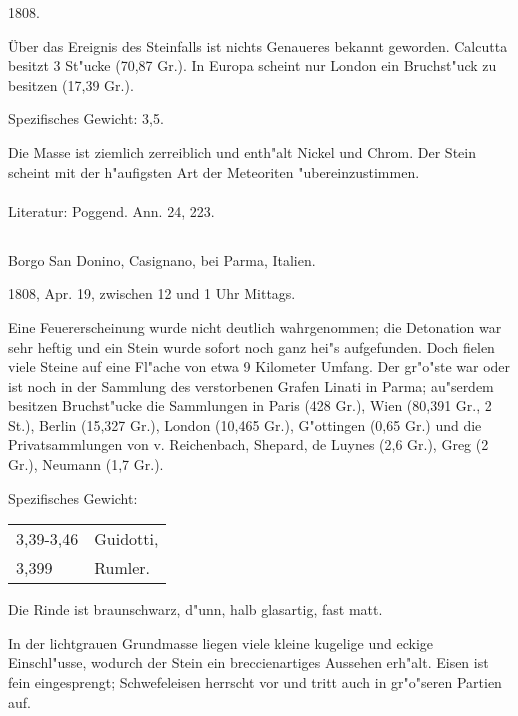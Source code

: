 \documentclass[a4paper, 11pt, oneside]{article}
\begin{document}
1808.

Über das Ereignis des Steinfalls ist nichts Genaueres bekannt geworden. Calcutta besitzt 3 St"ucke (70,87 Gr.). In Europa scheint nur London ein Bruchst"uck zu besitzen (17,39 Gr.).

Spezifisches Gewicht: 3,5.

Die Masse ist ziemlich zerreiblich und enth"alt Nickel und Chrom. Der Stein scheint mit der h"aufigsten Art der Meteoriten "ubereinzustimmen.
\normalsize
\paragraph{}
Literatur: Poggend. Ann. 24, 223.
\subsection{}
\LARGE
\paragraph{}
Borgo San Donino, Casignano, bei Parma, Italien.

1808, Apr. 19, zwischen 12 und 1 Uhr Mittags.

Eine Feuererscheinung wurde nicht deutlich wahrgenommen; die Detonation war sehr heftig und ein Stein wurde sofort noch ganz hei"s aufgefunden. Doch fielen viele Steine auf eine Fl"ache von etwa 9 Kilometer Umfang. Der gr"o"ste war oder ist noch in der Sammlung des verstorbenen Grafen Linati in Parma; au"serdem besitzen Bruchst"ucke die Sammlungen in Paris (428 Gr.), Wien (80,391 Gr., 2 St.), Berlin (15,327 Gr.), London (10,465 Gr.), G"ottingen (0,65 Gr.) und die Privatsammlungen von v. Reichenbach, Shepard, de Luynes (2,6 Gr.), Greg (2 Gr.), Neumann (1,7 Gr.).

Spezifisches Gewicht:
\begin{table}[!ht]
    \centering\swabfamily\Large
    \begin{tabular}{l l}
        3,39-3,46 & Guidotti,\\
        3,399 & Rumler.
    \end{tabular}
\end{table}

Die Rinde ist braunschwarz, d"unn, halb glasartig, fast matt.

In der lichtgrauen Grundmasse liegen viele kleine kugelige und eckige Einschl"usse, wodurch der Stein ein breccienartiges Aussehen erh"alt. Eisen ist fein eingesprengt; Schwefeleisen herrscht vor und tritt auch in gr"o"seren Partien auf.
\end{document}
